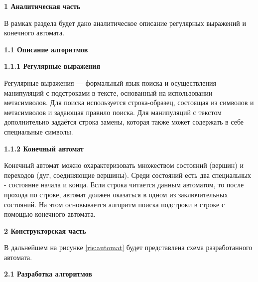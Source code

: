 \documentclass[a4paper,12pt]{report}
\begin{document}
	\setcounter{page}{2}
    \newpage

    \begin{center}
        \textbf{1 Аналитическая часть}
    \end{center}
        \label{sec:analitic_part}

        	В рамках раздела будет дано аналитическое описание регулярных выражений и конечного автомата.

	\begin{center}
        \textbf{1.1 Описание алгоритмов}
    \end{center}

		\begin{center}
			\textbf{1.1.1 Регулярные выражения}
		\end{center}
	
	       Регулярные выражения — формальный язык поиска и осуществления манипуляций с подстроками в тексте, основанный на использовании метасимволов. 
	       Для поиска используется строка-образец, состоящая из символов и метасимволов и задающая правило поиска.
	       Для манипуляций с текстом дополнительно задаётся строка замены, которая также может содержать в себе специальные символы.
	       
		\begin{center}
			\textbf{1.1.2 Конечный автомат}
	    \end{center}
   
		   Конечный автомат можно охарактеризовать множеством состояний (вершин) и переходов (дуг, соединяющие вершины). 
		   Среди состояний есть два специальных - состояние начала и конца. 
		   Если строка читается данным автоматом, то после прохода по строке, автомат должен оказаться в одном из заключительных состояний. 
		   На этом основывается алгоритм поиска подстроки в строке с помощью конечного автомата.

    \newpage

    \begin{center}
        \textbf{2 Конструкторская часть}
    \end{center}
        \label{sec:construct_part}

			В дальнейшем на рисунке \ref{ris:automat} будет представлена схема разработанного автомата.

	\begin{center}
        \textbf{2.1 Разработка алгоритмов}
    \end{center}
\end{document}
